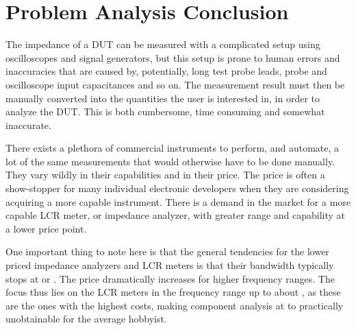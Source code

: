 \section{Problem Analysis Conclusion} \label{sec:probAnalConc}
The impedance of a DUT can be measured with a complicated setup using oscilloscopes and signal generators, but this setup is prone to human errors and inaccuracies that are caused by, potentially, long test probe leads, probe and oscilloscope input capacitances and so on. The measurement result must then be manually converted into the quantities the user is interested in, in order to analyze the DUT. This is both cumbersome, time consuming and somewhat inaccurate.

There exists a plethora of commercial instruments to perform, and automate, a lot of the same measurements that would otherwise have to be done manually. They vary wildly in their capabilities and in their price. The price is often a show-stopper for many individual electronic developers when they are considering acquiring a more capable instrument. There is a demand in the market for a more capable LCR meter, or impedance analyzer, with greater range and capability at a lower price point.

One important thing to note here is that the general tendencies for the lower priced impedance analyzers and LCR meters is that their bandwidth typically stops at  or . The price dramatically increases for higher frequency ranges. The focus thus lies on the LCR meters in the frequency range up to about , as these are the ones with the highest costs, making component analysis at  to  practically unobtainable for the average hobbyist.